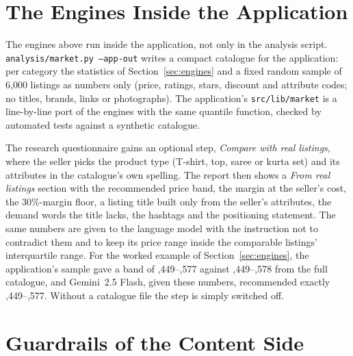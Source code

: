 \section{The Engines Inside the Application}
\label{sec:engines-app}

The engines above run inside the application, not only in the analysis script. \texttt{analysis/market.py --app-out} writes a compact catalogue for the application: per category the statistics of Section~\ref{sec:engines} and a fixed random sample of 6{,}000 listings as numbers only (price, ratings, stars, discount and attribute codes; no titles, brands, links or photographs). The application's \texttt{src/lib/market} is a line-by-line port of the engines with the same quantile function, checked by automated tests against a synthetic catalogue.

The research questionnaire gains an optional step, \emph{Compare with real listings}, where the seller picks the product type (T-shirt, top, saree or kurta set) and its attributes in the catalogue's own spelling. The report then shows a \emph{From real listings} section with the recommended price band, the margin at the seller's cost, the 30\%-margin floor, a listing title built only from the seller's attributes, the demand words the title lacks, the hashtags and the positioning statement. The same numbers are given to the language model with the instruction not to contradict them and to keep its price range inside the comparable listings' interquartile range. For the worked example of Section~\ref{sec:engines}, the application's sample gave a band of ,449--,577 against ,449--,578 from the full catalogue, and Gemini~2.5 Flash, given these numbers, recommended exactly ,449--,577. Without a catalogue file the step is simply switched off.

\section{Guardrails of the Content Side}


